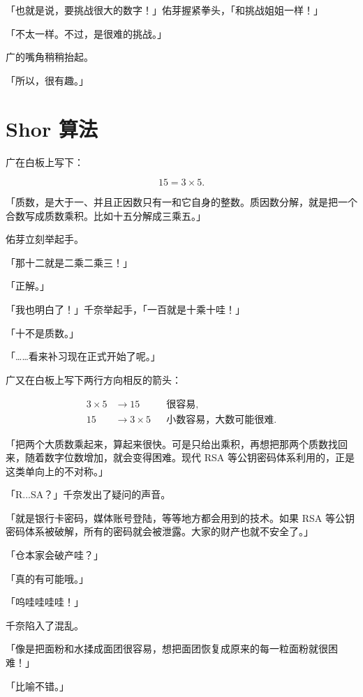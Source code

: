「也就是说，要挑战很大的数字！」佑芽握紧拳头，「和挑战姐姐一样！」

「不太一样。不过，是很难的挑战。」

广的嘴角稍稍抬起。

「所以，很有趣。」

\prologuedivider

\section{Shor 算法}

广在白板上写下：

\begin{equation}
15 = 3 \times 5.
\end{equation}

「质数，是大于一、并且正因数只有一和它自身的整数。质因数分解，就是把一个合数写成质数乘积。比如十五分解成三乘五。」

佑芽立刻举起手。

「那十二就是二乘二乘三！」

「正解。」

「我也明白了！」千奈举起手，「一百就是十乘十哇！」

「十不是质数。」

「……看来补习现在正式开始了呢。」

广又在白板上写下两行方向相反的箭头：

\begin{align*}
3 \times 5 &\longrightarrow 15 && \text{很容易},\\
15 &\longrightarrow 3 \times 5 && \text{小数容易，大数可能很难}.
\end{align*}

「把两个大质数乘起来，算起来很快。可是只给出乘积，再想把那两个质数找回来，随着数字位数增加，就会变得困难。现代 RSA 等公钥密码体系利用的，正是这类单向上的不对称。」

「R...SA？」千奈发出了疑问的声音。

「就是银行卡密码，媒体账号登陆，等等地方都会用到的技术。如果 RSA 等公钥密码体系被破解，所有的密码就会被泄露。大家的财产也就不安全了。」

「仓本家会破产哇？」

「真的有可能哦。」

「呜哇哇哇哇！」

千奈陷入了混乱。

「像是把面粉和水揉成面团很容易，想把面团恢复成原来的每一粒面粉就很困难！」

「比喻不错。」

